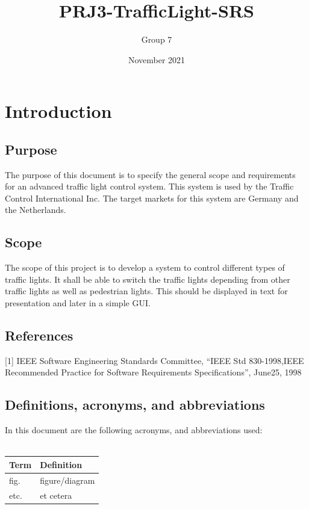 \documentclass[a4paper]{report}
\title{PRJ3-TrafficLight-SRS}
\author{ Group 7 }
\date{November 2021}
\begin{document}
\maketitle
\newpage
\tableofcontents

\chapter{Introduction}

\section{Purpose}
The purpose of this document is to specify the general scope and requirements for an advanced traffic light control system. This system is used by the Traffic Control International Inc. The target markets for this system are Germany and the Netherlands.

\section{Scope}
The scope of this project is to develop a system to control different types of traffic lights. It shall be able to switch the traffic lights depending from other traffic lights as well as pedestrian lights. This should be displayed in text for presentation and later in a simple GUI.

\section{References}
[1]  IEEE  Software  Engineering  Standards  Committee,  “IEEE  Std  830-1998,IEEE Recommended Practice for Software Requirements Specifications”, June25, 1998

\section{Definitions, acronyms, and abbreviations}
In this document are the following acronyms, and abbreviations used:\\\\
\begin{tabular}{|l|l|}
    \hline
    \bf Term & \bf Definition\\
    \hline
    fig. & figure/diagram \\
    \hline
    etc. & et cetera\\
    \hline
\end{tabular}\\
\end{document}
